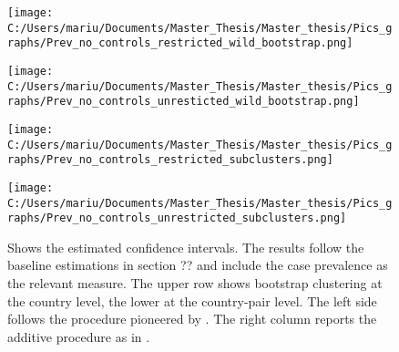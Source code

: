 \documentclass{article}
\begin{document}
\begin{figure}[!ht] 
\begin{minipage}[t]{0.5\linewidth}\vspace{0pt} 
\texttt{[image: C:/Users/mariu/Documents/Master\_Thesis/Master\_thesis/Pics\_graphs/Prev\_no\_controls\_restricted\_wild\_bootstrap.png]}\\
\vspace{2ex}
\end{minipage}\hfill%
\begin{minipage}[t]{0.5\linewidth}\vspace{0pt} 
\texttt{[image: C:/Users/mariu/Documents/Master\_Thesis/Master\_thesis/Pics\_graphs/Prev\_no\_controls\_unresticted\_wild\_bootstrap.png]}\\
\vspace{2ex}
\end{minipage}\hfill%
\begin{minipage}[t]{0.5\linewidth}\vspace{0pt} 
\texttt{[image: C:/Users/mariu/Documents/Master\_Thesis/Master\_thesis/Pics\_graphs/Prev\_no\_controls\_restricted\_subclusters.png]}\\
\vspace{2ex}
\end{minipage}\hfill%
\begin{minipage}[t]{0.5\linewidth}\vspace{0pt} 
\texttt{[image: C:/Users/mariu/Documents/Master\_Thesis/Master\_thesis/Pics\_graphs/Prev\_no\_controls\_unrestricted\_subclusters.png]}\\
\vspace{2ex}
\end{minipage}\hfill%
\caption{Shows the estimated confidence intervals. The results follow the baseline estimations in section ?? and include the case prevalence as the relevant measure.
The upper row shows bootstrap clustering at the country level, the lower at the country-pair level. The left side follows the procedure pioneered by \cite{cameron2008bootstrap}. The right column reports the additive procedure as in \cite{mackinnon2018wild}.} 
\label{Wild cluster bootstrap I}
\end{figure}
\end{document}
